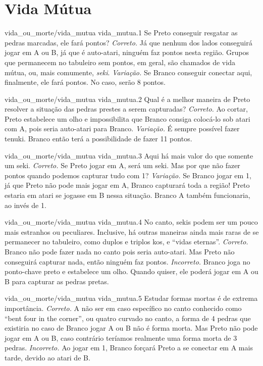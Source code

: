\chapter{Vida Mútua}

\emptypage

\problemAnswerDiagram
  {vida_ou_morte/vida_mutua}
  {vida_mutua.1}
  {Se Preto conseguir resgatar as pedras marcadas, ele fará pontos?}
  {\emph{Correto.} Já que nenhum dos lados conseguirá jogar em A ou B, já que é auto-atari, ninguém faz pontos nesta região. Grupos que permanecem no tabuleiro sem pontos, em geral, são chamados de vida mútua, ou, mais comumente, \emph{seki}.}
  {\emph{Variação.} Se Branco conseguir conectar aqui, finalmente, ele fará pontos. No caso, serão 8 pontos.}

\problemAnswerDiagram
  {vida_ou_morte/vida_mutua}
  {vida_mutua.2}
  {Qual é a melhor maneira de Preto resolver a situação das pedras prestes a serem capturadas?}
  {\emph{Correto.} Ao cortar, Preto estabelece um olho e impossibilita que Branco consiga colocá-lo sob atari com A, pois seria auto-atari para Branco.}
  {\emph{Variação.} É sempre possível fazer tenuki. Branco então terá a possibilidade de fazer 11 pontos.}

\problemAnswerDiagram
  {vida_ou_morte/vida_mutua}
  {vida_mutua.3}
  {Aqui há mais valor do que somente um seki.}
  {\emph{Correto.} Se Preto jogar em A, será um seki. Mas por que não fazer pontos quando podemos capturar tudo com 1?}
  {\emph{Variação.} Se Branco jogar em 1, já que Preto não pode mais jogar em A, Branco capturará toda a região! Preto estaria em atari se jogasse em B nessa situação. Branco A também funcionaria, ao invés de 1.}

\problemAnswerDiagram
  {vida_ou_morte/vida_mutua}
  {vida_mutua.4}
  {No canto, sekis podem ser um pouco mais estranhos ou peculiares. Inclusive, há outras maneiras ainda mais raras de se permanecer no tabuleiro, como duplos e triplos kos, e ``vidas eternas''.}
  {\emph{Correto.} Branco não pode fazer nada no canto pois seria auto-atari. Mas Preto não conseguirá capturar nada, então ninguém faz pontos.}
  {\emph{Incorreto.} Branco joga no ponto-chave preto e estabelece um olho. Quando quiser, ele poderá jogar em A ou B para capturar as pedras pretas.}

\problemAnswerDiagram
  {vida_ou_morte/vida_mutua}
  {vida_mutua.5}
  {Estudar formas mortas é de extrema importância.}
  {\emph{Correto.} A não ser em caso específico no canto conhecido como ``bent four in the corner'', ou quatro curvado no canto, a forma de 4 pedras que existiria no caso de Branco jogar A ou B não é forma morta. Mas Preto não pode jogar em A ou B, caso contrário teríamos realmente uma forma morta de 3 pedras.}
  {\emph{Incorreto.} Ao jogar em 1, Branco forçará Preto a se conectar em A mais tarde, devido ao atari de B.}